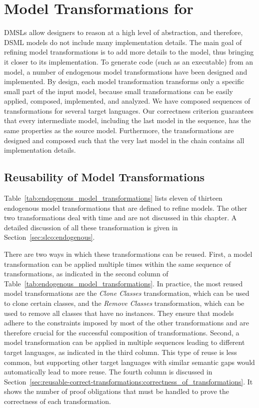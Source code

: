 \section{Model Transformations for \SLCO}
\label{sec:reusable-correct-transformations:model_transformations}
DMSLs allow designers to reason at a high level of abstraction, and therefore, DSML models do not include many implementation details.
The main goal of refining model transformations is to add more details to the model, thus bringing it closer to its implementation.
To generate code (such as an \NQC executable) from an \SLCO model, a number of endogenous model transformations have been designed and implemented.
By design, each model transformation transforms only a specific small part of the input model, because small transformations can be easily applied, composed, implemented, and analyzed.
We have composed sequences of transformations for several target languages.
Our correctness criterion guarantees that every intermediate model, including the last model in the sequence, has the same properties as the source model.
Furthermore, the transformations are designed and composed such that the very last \SLCO model in the chain contains all implementation details.

\subsection{Reusability of Model Transformations}
\label{subsec:reusable-correct-transformations:reusability}
Table~\ref{tab:endogenous_model_transformations} lists eleven of thirteen endogenous model transformations that are defined to refine \SLCO models.
The other two transformations deal with time and are not discussed in this chapter.
A detailed discussion of all these transformation is given in Section~\ref{sec:slco:endogenous}.

There are two ways in which these transformations can be reused.
First, a model transformation can be applied multiple times within the same sequence of transformations, as indicated in the second column of Table~\ref{tab:endogenous_model_transformations}.
In practice, the most reused model transformations are the \emph{Clone Classes} transformation, which can be used to clone certain classes, and the \emph{Remove Classes} transformation, which can be used to remove all classes that have no instances.
They ensure that models adhere to the constraints imposed by most of the other transformations and are therefore crucial for the successful composition of transformations.
Second, a model transformation can be applied in multiple sequences leading to different target languages, as indicated in the third column.
This type of reuse is less common, but supporting other target languages with similar semantic gaps would automatically lead to more reuse.
The fourth column is discussed in Section~\ref{sec:reusable-correct-transformations:correctness_of_transformations}.
It shows the number of proof obligations that must be handled to prove the correctness of each transformation.

